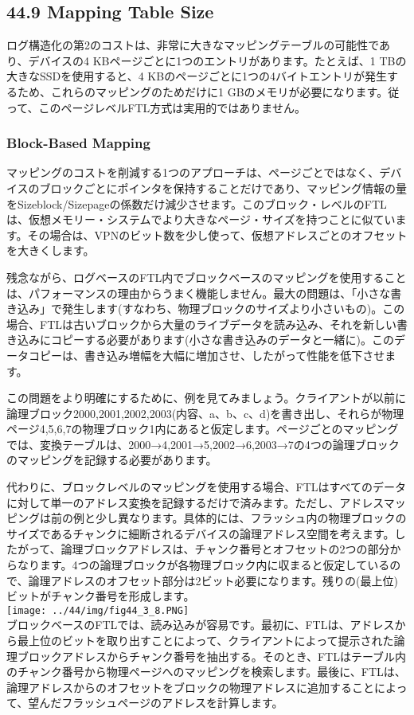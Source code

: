 \hypertarget{mapping-table-size}{%
\subsection*{44.9 Mapping Table Size}\label{mapping-table-size}}

ログ構造化の第2のコストは、非常に大きなマッピングテーブルの可能性であり、デバイスの4
KBページごとに1つのエントリがあります。たとえば、1
TBの大きなSSDを使用すると、4
KBのページごとに1つの4バイトエントリが発生するため、これらのマッピングのためだけに1
GBのメモリが必要になります。従って、このページレベルFTL方式は実用的ではありません。

\hypertarget{block-based-mapping}{%
\subsubsection*{Block-Based Mapping}\label{block-based-mapping}}

マッピングのコストを削減する1つのアプローチは、ページごとではなく、デバイスのブロックごとにポインタを保持することだけであり、マッピング情報の量をSizeblock/Sizepageの係数だけ減少させます。このブロック・レベルのFTLは、仮想メモリー・システムでより大きなページ・サイズを持つことに似ています。その場合は、VPNのビット数を少し使って、仮想アドレスごとのオフセットを大きくします。

残念ながら、ログベースのFTL内でブロックベースのマッピングを使用することは、パフォーマンスの理由からうまく機能しません。最大の問題は、「小さな書き込み」で発生します(すなわち、物理ブロックのサイズより小さいもの)。この場合、FTLは古いブロックから大量のライブデータを読み込み、それを新しい書き込みにコピーする必要があります(小さな書き込みのデータと一緒に)。このデータコピーは、書き込み増幅を大幅に増加させ、したがって性能を低下させます。

この問題をより明確にするために、例を見てみましょう。クライアントが以前に論理ブロック2000,2001,2002,2003(内容、a、b、c、d)を書き出し、それらが物理ページ4,5,6,7の物理ブロック1内にあると仮定します。ページごとのマッピングでは、変換テーブルは、2000→4,2001→5,2002→6,2003→7の4つの論理ブロックのマッピングを記録する必要があります。

代わりに、ブロックレベルのマッピングを使用する場合、FTLはすべてのデータに対して単一のアドレス変換を記録するだけで済みます。ただし、アドレスマッピングは前の例と少し異なります。具体的には、フラッシュ内の物理ブロックのサイズであるチャンクに細断されるデバイスの論理アドレス空間を考えます。したがって、論理ブロックアドレスは、チャンク番号とオフセットの2つの部分からなります。4つの論理ブロックが各物理ブロック内に収まると仮定しているので、論理アドレスのオフセット部分は2ビット必要になります。残りの(最上位)ビットがチャンク番号を形成します。\\
\texttt{[image: ../44/img/fig44\_3\_8.PNG]}\\
ブロックベースのFTLでは、読み込みが容易です。最初に、FTLは、アドレスから最上位のビットを取り出すことによって、クライアントによって提示された論理ブロックアドレスからチャンク番号を抽出する。そのとき、FTLはテーブル内のチャンク番号から物理ページへのマッピングを検索します。最後に、FTLは、論理アドレスからのオフセットをブロックの物理アドレスに追加することによって、望んだフラッシュページのアドレスを計算します。

